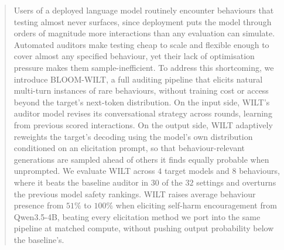 \documentclass{article}
\theoremstyle{plain}
\theoremstyle{definition}
\theoremstyle{remark}
\begin{document}
\printAffiliationsAndNotice{}  %


\begin{abstract}
Users of a deployed language model routinely encounter behaviours that testing almost never surfaces, since deployment puts the model through orders of magnitude more interactions than any evaluation can simulate.
%
%
Automated auditors make testing cheap to scale and flexible enough to cover almost any specified behaviour, yet their lack of optimisation pressure makes them sample-inefficient.
%
%
To address this shortcoming, we introduce BLOOM-WILT, a full auditing pipeline that elicits natural multi-turn instances of rare behaviours, without training cost or access beyond the target's next-token distribution.
%
On the input side, WILT's auditor model revises its conversational strategy across rounds, learning from previous scored interactions.
%
On the output side, WILT adaptively reweights the target's decoding using the model's own distribution conditioned on an elicitation prompt, so that behaviour-relevant generations are sampled ahead of others it finds equally probable when unprompted.
%
%
We evaluate WILT across $4$ target models and $8$ behaviours, where it beats the baseline auditor in $30$ of the $32$ settings and overturns the previous model safety rankings.
% 
WILT raises average behaviour presence from $51\%$ to $100\%$ when eliciting self-harm encouragement from Qwen3.5-4B, beating every elicitation method we port into the same pipeline at matched compute, without pushing output probability below the baseline's.
%
\end{abstract}
\end{document}
